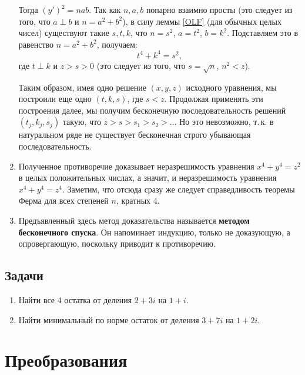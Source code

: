 \begin{enumerate}
Тогда $(y')^2=nab$. Так как $n,a,b$ попарно взаимно просты (это следует из того, что $a\perp b$ и $n=a^2+b^2$), в силу леммы \ref{OLF} (для обычных целых чисел) существуют такие $s,t,k$, что $n=s^2$, $a=t^2$, $b=k^2$. Подставляем это в равенство $n=a^2+b^2$, получаем:
$$
t^4+k^4=s^2,
$$
где $t\perp k$ и $z>s>0$ (это следует из того, что $s=\sqrt n$, $n^2<z$). 

Таким образом, имея одно решение $(x,y,z)$ исходного уравнения, мы построили еще одно $(t,k,s)$, где $s<z$. Продолжая применять эти построения далее, мы получим бесконечную последовательность решений $(t_j,k_j,s_j)$ такую, что $z>s>s_1>s_2>\dots$ Но это невозможно, т.\,к. в натуральном ряде не существует бесконечная строго убывающая последовательность.

\item Полученное противоречие доказывает неразрешимость уравнения $x^4+y^4=z^2$ в целых положительных числах, а значит, и неразрешимость уравнения $x^4+y^4=z^4$. Заметим, что отсюда сразу же следует справедливость теоремы Ферма для всех степеней $n$, кратных 4.

\item Предъявленный здесь метод доказательства называется \textbf{методом бесконечного спуска}. Он напоминает индукцию, только не доказующую, а опровергающую, поскольку приводит к противоречию.

\end{enumerate}



\subsection*{Задачи}
\begin{enumerate}
\item Найти все 4 остатка от деления $2+3i$ на $1+i$.
\item Найти минимальный по норме остаток от деления $3+7i$ на $1+2i$.
\end{enumerate}




\section{Преобразования}

